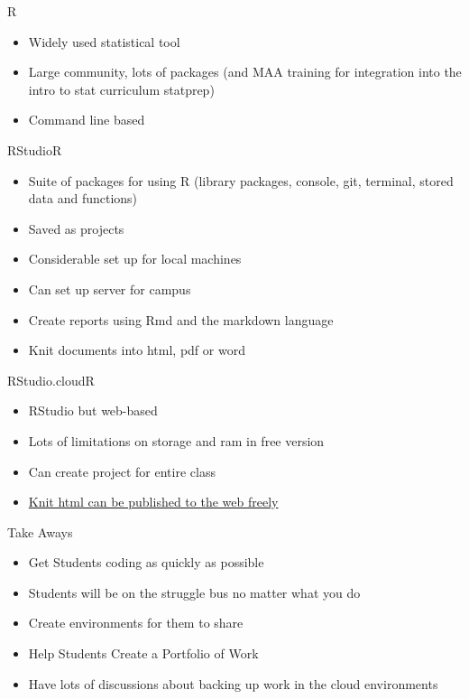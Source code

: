 \documentclass[xcolor=pdftex,dvipsnames,table]{beamer}
\begin{document}
\begin{frame}{R}

\begin{itemize}
\item Widely used statistical tool \pause
\item Large community, lots of packages (and MAA training for integration into the intro to stat curriculum statprep)\pause
\item Command line based
\end{itemize}
\end{frame}

\begin{frame}{RStudio}{R}

\begin{itemize}
\item Suite of packages for using R (library packages, console, git, terminal, stored data and functions) \pause
\item Saved as projects \pause
\item Considerable set up for local machines  \pause
\item Can set up server for campus \pause
\item Create reports using Rmd and the markdown language  \pause
\item Knit documents into html, pdf or word \pause
\end{itemize}

\end{frame}
\begin{frame}{RStudio.cloud}{R}

\begin{itemize}
\item RStudio but web-based \pause
\item Lots of limitations on storage and ram in free version \pause
\item Can create project for entire class  \pause
\item \href{https://rpubs.com/nurfnick/696714}{Knit html can be published to the web freely}
\end{itemize}

\end{frame}
\begin{frame}{Take Aways}
\begin{itemize}
\item Get Students coding as quickly as possible
\item Students will be on the struggle bus no matter what you do
\item Create environments for them to share
\item Help Students Create a Portfolio of Work
\item Have lots of discussions about backing up work in the cloud environments
\end{itemize}
\end{frame}
\end{document}
